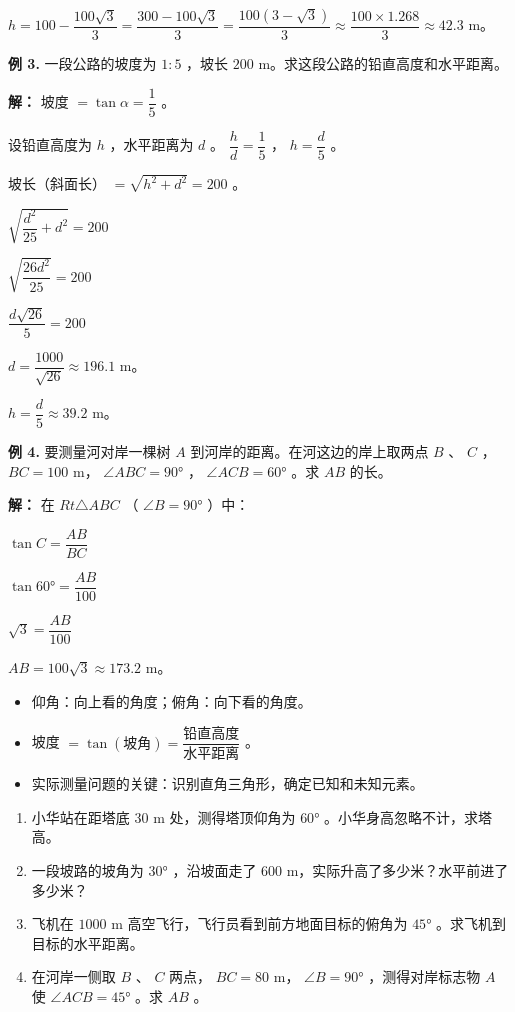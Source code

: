 \begin{workedexamples}
$h = 100 - \dfrac{100\sqrt{3}}{3} = \dfrac{300 - 100\sqrt{3}}{3} = \dfrac{100(3 - \sqrt{3})}{3} \approx \dfrac{100 \times 1.268}{3} \approx 42.3$ m。

\textbf{例 3.} 一段公路的坡度为 $1:5$ ，坡长 $200$ m。求这段公路的铅直高度和水平距离。

\textbf{解：}
坡度 $= \tan \alpha = \dfrac{1}{5}$ 。

设铅直高度为 $h$ ，水平距离为 $d$ 。 $\dfrac{h}{d} = \dfrac{1}{5}$ ， $h = \dfrac{d}{5}$ 。

坡长（斜面长） $= \sqrt{h^2 + d^2} = 200$ 。

$\sqrt{\dfrac{d^2}{25} + d^2} = 200$

$\sqrt{\dfrac{26d^2}{25}} = 200$

$\dfrac{d\sqrt{26}}{5} = 200$

$d = \dfrac{1000}{\sqrt{26}} \approx 196.1$ m。

$h = \dfrac{d}{5} \approx 39.2$ m。

\textbf{例 4.} 要测量河对岸一棵树 $A$ 到河岸的距离。在河这边的岸上取两点 $B$ 、 $C$ ， $BC = 100$ m， $\angle ABC = 90°$ ， $\angle ACB = 60°$ 。求 $AB$ 的长。

\textbf{解：}
在 $Rt\triangle ABC$ （ $\angle B = 90°$ ）中：

$\tan C = \dfrac{AB}{BC}$

$\tan 60° = \dfrac{AB}{100}$

$\sqrt{3} = \dfrac{AB}{100}$

$AB = 100\sqrt{3} \approx 173.2$ m。

\end{workedexamples}

\begin{keytakeaway}


\begin{itemize}
  \item 仰角：向上看的角度；俯角：向下看的角度。
  \item 坡度 $= \tan(\text{坡角}) = \dfrac{\text{铅直高度}}{\text{水平距离}}$ 。
  \item 实际测量问题的关键：识别直角三角形，确定已知和未知元素。
\end{itemize}


\end{keytakeaway}

\begin{practice}


\begin{enumerate}
  \item 小华站在距塔底 $30$ m 处，测得塔顶仰角为 $60°$ 。小华身高忽略不计，求塔高。
  \item 一段坡路的坡角为 $30°$ ，沿坡面走了 $600$ m，实际升高了多少米？水平前进了多少米？
  \item 飞机在 $1000$ m 高空飞行，飞行员看到前方地面目标的俯角为 $45°$ 。求飞机到目标的水平距离。
  \item 在河岸一侧取 $B$ 、 $C$ 两点， $BC = 80$ m， $\angle B = 90°$ ，测得对岸标志物 $A$ 使 $\angle ACB = 45°$ 。求 $AB$ 。
\end{enumerate}


\end{practice}



